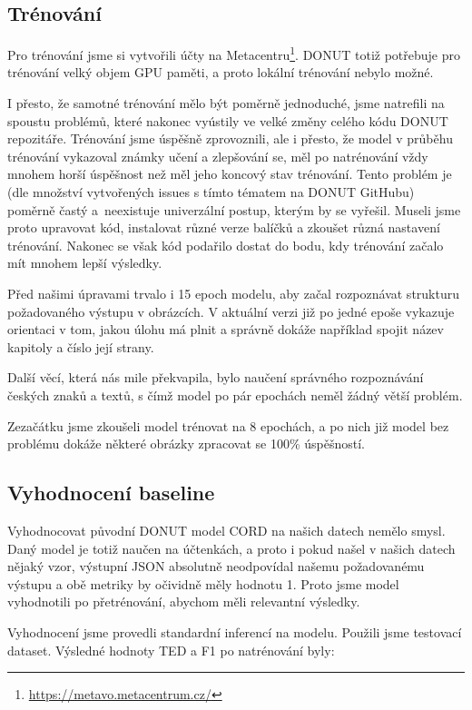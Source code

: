 \documentclass{article}
\begin{document}
\subsection{Trénování}

Pro trénování jsme si vytvořili účty na Metacentru\footnote{\url{https://metavo.metacentrum.cz/}}. DONUT totiž potřebuje pro trénování velký objem GPU paměti, a proto lokální trénování nebylo možné.

I přesto, že samotné trénování mělo být poměrně jednoduché, jsme natrefili na spoustu problémů, které nakonec vyústily ve velké změny celého kódu DONUT repozitáře. Trénování jsme úspěšně zprovoznili, ale i přesto, že model v průběhu trénování vykazoval známky učení a zlepšování se, měl po natrénování vždy mnohem horší úspěšnost než měl jeho koncový stav trénování. Tento problém je (dle množství vytvořených issues s tímto tématem na DONUT GitHubu) poměrně častý a~neexistuje univerzální postup, kterým by se vyřešil. Museli jsme proto upravovat kód, instalovat různé verze balíčků a zkoušet různá nastavení trénování. Nakonec se však kód podařilo dostat do bodu, kdy trénování začalo mít mnohem lepší výsledky.

Před našimi úpravami trvalo i 15 epoch modelu, aby začal rozpoznávat strukturu požadovaného výstupu v obrázcích. V aktuální verzi již po jedné epoše vykazuje orientaci v tom, jakou úlohu má plnit a správně dokáže například spojit název kapitoly a číslo její strany.

Další věcí, která nás mile překvapila, bylo naučení správného rozpoznávání českých znaků a textů, s čímž model po pár epochách neměl žádný větší problém.

Zezačátku jsme zkoušeli model trénovat na 8 epochách, a po nich již model bez problému dokáže některé obrázky zpracovat se 100\% úspěšností.

\subsection{Vyhodnocení baseline}

Vyhodnocovat původní DONUT model CORD na našich datech nemělo smysl. Daný model je totiž naučen na účtenkách, a proto i pokud našel v našich datech nějaký vzor, výstupní JSON absolutně neodpovídal našemu požadovanému výstupu a obě metriky by očividně měly hodnotu 1. Proto jsme model vyhodnotili po přetrénování, abychom měli relevantní výsledky.

Vyhodnocení jsme provedli standardní inferencí na modelu. Použili jsme testovací dataset. Výsledné hodnoty TED a F1 po natrénování byly:
\end{document}
